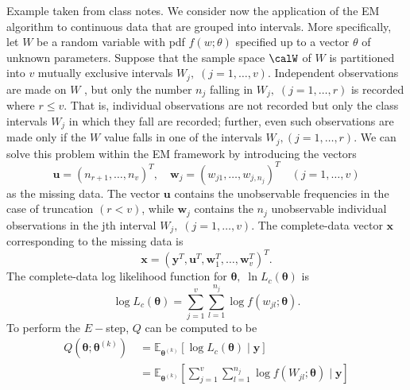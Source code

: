 \begin{exam} \label{exam: em_binned_normal}
    Example taken from class notes. We consider now the application of the EM algorithm to continuous data that are grouped into
    intervals. More specifically, let $W$ be a random variable with pdf $f (w; \theta)$ specified up to a vector $\theta$ of unknown parameters. Suppose that the sample space $\calW$ of $W$ is partitioned into $v$ mutually exclusive intervals $W_j , \; (j = 1, \ldots , v)$. Independent observations are made on $W$ , but only the
    number $n_j$ falling in $W_j , \; (j = 1, \ldots , r)$ is recorded where $r \leq v$. That is, individual observations are not recorded but only the class intervals $W_j$ in which they fall are recorded; further, even such observations are made only if the $W$ value falls in one of the intervals $W_j, (j = 1, \ldots , r)$. We can solve this problem within the EM framework by introducing the vectors
    \begin{equation*}
        \boldsymbol{u}=\left(n_{r+1}, \ldots, n_{v}\right)^{T} , \quad \boldsymbol{w}_{j}=\left(w_{j 1}, \ldots, w_{j, n_{j}}\right)^{T} \quad(j=1, \ldots, v)
    \end{equation*}
    as the missing data. The vector $\bm{u}$ contains the unobservable frequencies in the case of truncation $(r < v)$, while $\bm{w}_j$ contains the $n_j$ unobservable individual observations in the jth interval $W_j , \; (j = 1, \ldots , v)$. The complete-data vector $\bm{x}$ corresponding to the missing data is
    \begin{equation*}
        \boldsymbol{x}=\left(\boldsymbol{y}^{T}, \boldsymbol{u}^{T}, \boldsymbol{w}_{1}^{T}, \ldots, \boldsymbol{w}_{v}^{T}\right)^{T}.
    \end{equation*}
    The complete-data log likelihood function for $\bm{\theta} , \; \ln L_c (\bm{\theta})$ is
    \begin{equation*}
        \log L_{c} (\bm{\theta}) = \sum_{j=1}^{v} \sum_{l=1}^{n_j} \log f \left( w_{jl} ; \bm{\theta} \right).
    \end{equation*}
    To perform the $E-$step, $Q$ can be computed to be
    \begin{align*}
        Q \left( \bm{\theta}; \bm{\theta}^{(k)} \right) \
         & = \mathbb{E}_{\bm{\theta}^{(k)}} \left[ \log L_{c} (\bm{\theta}) \mid \bm{y} \right]                                                                                                           \\
         & = \mathbb{E}_{\bm{\theta}^{(k)}} \left[ \sum_{j=1}^{v} \sum_{l=1}^{n_j} \log f \left( W_{jl} ; \bm{\theta} \right) \mid \bm{y} \right]                                                         \\

\end{align*}
\end{exam}

